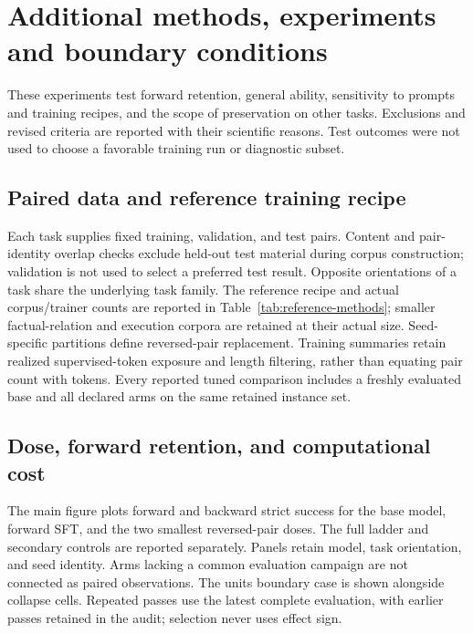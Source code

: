 \section{Additional methods, experiments and boundary conditions}
\label{app:planned-evaluations}
These experiments test forward retention, general ability, sensitivity to prompts and
training recipes, and the scope of preservation on other tasks. Exclusions and revised
criteria are reported with their scientific reasons. Test outcomes were not used to choose
a favorable training run or diagnostic subset.


\subsection{Paired data and reference training recipe}
\label{app:reference-methods}

Each task supplies fixed training, validation, and test pairs. Content and pair-identity
overlap checks exclude held-out test material during corpus construction; validation is
not used to select a preferred test result. Opposite orientations of a task share the
underlying task family. The reference recipe and actual corpus/trainer counts are reported
in Table~\ref{tab:reference-methods}; smaller factual-relation and execution corpora are
retained at their actual size. Seed-specific partitions define reversed-pair replacement.
Training summaries retain realized supervised-token exposure and length filtering, rather
than equating pair count with tokens. Every reported tuned comparison includes a freshly
evaluated base and all declared arms on the same retained instance set.


\subsection{Dose, forward retention, and computational cost}
\label{app:dose-summary}

The main figure plots forward and backward strict success for the base model, forward SFT,
and the two smallest reversed-pair doses. The full ladder and secondary controls are
reported separately. Panels retain
model, task orientation, and seed identity. Arms lacking a common evaluation campaign are not
connected as paired observations. The units boundary case is shown alongside collapse cells.
Repeated passes use the latest complete evaluation, with earlier passes retained in the
audit; selection never uses effect sign.

